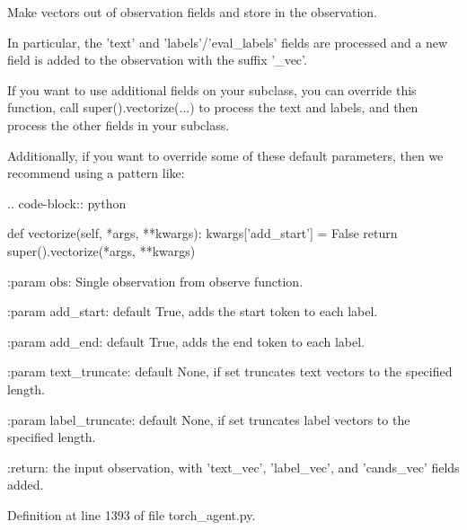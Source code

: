 \begin{DoxyVerb}Make vectors out of observation fields and store in the observation.

In particular, the 'text' and 'labels'/'eval_labels' fields are
processed and a new field is added to the observation with the suffix
'_vec'.

If you want to use additional fields on your subclass, you can override
this function, call super().vectorize(...) to process the text and
labels, and then process the other fields in your subclass.

Additionally, if you want to override some of these default parameters,
then we recommend using a pattern like:

.. code-block:: python

  def vectorize(self, *args, **kwargs):
      kwargs['add_start'] = False
      return super().vectorize(*args, **kwargs)


:param obs:
    Single observation from observe function.

:param add_start:
    default True, adds the start token to each label.

:param add_end:
    default True, adds the end token to each label.

:param text_truncate:
    default None, if set truncates text vectors to the specified
    length.

:param label_truncate:
    default None, if set truncates label vectors to the specified
    length.

:return:
    the input observation, with 'text_vec', 'label_vec', and
    'cands_vec' fields added.
\end{DoxyVerb}
 

Definition at line 1393 of file torch\+\_\+agent.\+py.


